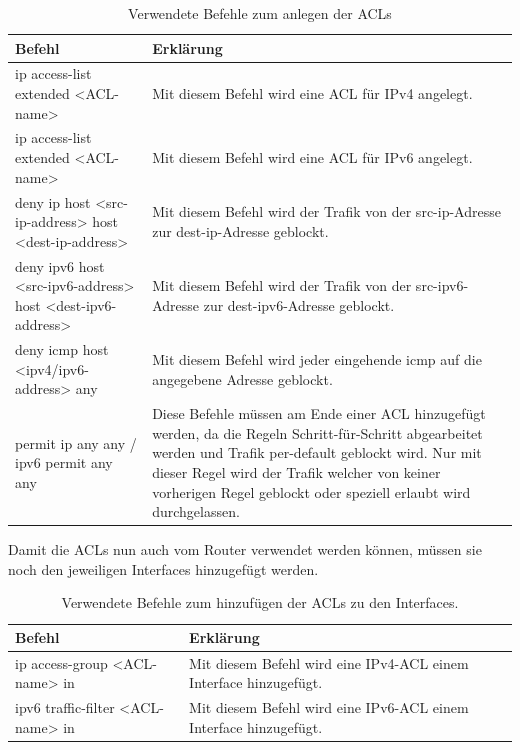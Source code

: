 \documentclass{article}
\begin{document}
\begin{table}[htbp]
    \centering
    \begin{tabularx}{\textwidth}{|X|X|}
        \toprule
        \textbf{Befehl} & \textbf{Erklärung} \\
        \midrule
        ip access-list extended <ACL-name> & Mit diesem Befehl wird eine ACL für IPv4 angelegt.\\
        \hline
        ip access-list extended <ACL-name> & Mit diesem Befehl wird eine ACL für IPv6 angelegt.\\
        \hline
        deny ip host <src-ip-address> host <dest-ip-address> & Mit diesem Befehl wird der Trafik von der src-ip-Adresse zur dest-ip-Adresse geblockt.\\ 
        \hline
        deny ipv6 host <src-ipv6-address> host <dest-ipv6-address> & Mit diesem Befehl wird der Trafik von der src-ipv6-Adresse zur dest-ipv6-Adresse geblockt.\\
        \hline
        deny icmp host <ipv4/ipv6-address> any & Mit diesem Befehl wird jeder eingehende icmp auf die angegebene Adresse geblockt.\\
        \hline
        permit ip any any / ipv6 permit any any & Diese Befehle müssen am Ende einer ACL hinzugefügt werden, da die Regeln Schritt-für-Schritt abgearbeitet werden und Trafik per-default geblockt wird. Nur mit dieser Regel wird der Trafik welcher von keiner vorherigen Regel geblockt oder speziell erlaubt wird durchgelassen.\\ 
        \bottomrule
    \end{tabularx}
    \caption{Verwendete Befehle zum anlegen der ACLs}
    \label{tab:commands}
\end{table}

\noindent Damit die ACLs nun auch vom Router verwendet werden können, müssen sie noch den jeweiligen Interfaces hinzugefügt werden.\\

\begin{table}[htbp]
    \centering
    \begin{tabularx}{\textwidth}{|X|X|}
        \toprule
        \textbf{Befehl} & \textbf{Erklärung} \\
        \midrule
        ip access-group <ACL-name> in & Mit diesem Befehl wird eine IPv4-ACL einem Interface hinzugefügt.\\
        \hline
        ipv6 traffic-filter <ACL-name> in & Mit diesem Befehl wird eine IPv6-ACL einem Interface hinzugefügt.\\
        \bottomrule
    \end{tabularx}
    \caption{Verwendete Befehle zum hinzufügen der ACLs zu den Interfaces.}
    \label{tab:commands}
\end{table}
\end{document}
